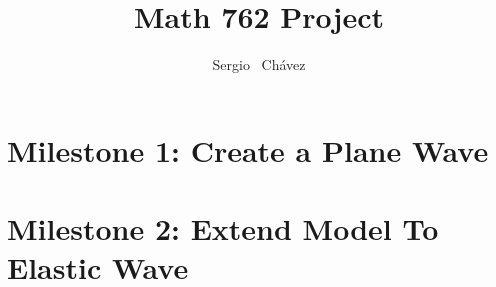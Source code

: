 \documentclass{article}
\title{Math 762 Project}
\author{
  Sergio ~Ch\'{a}vez
}
\begin{document}
\maketitle

\begin{abstract}

\end{abstract}



\section{Milestone 1: Create a Plane Wave}



\section{Milestone 2: Extend Model To Elastic Wave}






\end{document}
